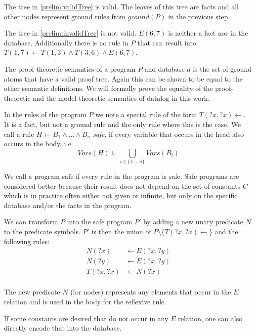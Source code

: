 \begin{contexample}
    The tree in \cref{prelim:validTree} is valid. The leaves of this tree are facts and all other nodes represent ground rules from $ground(P)$ in the previous step.

    The tree in \cref{prelim:invalidTree} is not valid. $E(6,7)$ is neither a fact nor in the database. Additionally there is no rule in $P$ that can result into $T(1,7) \leftarrow T(1,3) \land T(3,6) \land E(6,7)$.
\end{contexample}

The proof-theoretic semantics of a program $P$ and database $d$ is the set of ground atoms that have a valid proof tree. Again this can be shown to be equal to the other semantic definitions. We will formally prove the equality of the proof-theoretic and the model-theoretic semantics of datalog in this work.

In the rules of the program $P$ we note a special rule of the form $T(?x, ?x) \leftarrow$. It is a fact, but not a ground rule and the only rule where this is the case. 
We call a rule $H \leftarrow B_1 \land ... \land B_n$ \textit{safe}, if every variable that occurs in the head also occurs in the body, i.e. \[Vars(H) \subseteq \bigcup_{i \in \{1,..,n\} } Vars(B_i) \]

We call a program safe if every rule in the program is safe. Safe programs are considered better because their result does not depend on the set of constants $C$ which is in practice often either not given or infinite, but only on the specific database and/or the facts in the program.

\begin{contexample}
    We can transform $P$ into the safe program $P'$ by adding a new unary predicate $N$ to the predicate symbols. $P'$ is then the union of $P \setminus \{T(?x, ?x) \leftarrow \}$ and the following rules:
    \begin{equation}
        \begin{split}
            N(?x) &\leftarrow E(?x, ?y) \\
            N(?y) &\leftarrow E(?x, ?y) \\
            T(?x,?x) &\leftarrow N(?x) \\
        \end{split}
    \end{equation}

    The new predicate $N$ (for nodes) represents any elements that occur in the $E$ relation and is used in the body for the reflexive rule.

    If some constants are desired that do not occur in any $E$ relation, one can also directly encode that into the database.
\end{contexample}

